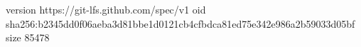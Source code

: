 version https://git-lfs.github.com/spec/v1
oid sha256:b2345dd0f06aeba3d81bbe1d0121cb4cfbdca81ed75e342e986a2b59033d05bf
size 85478
